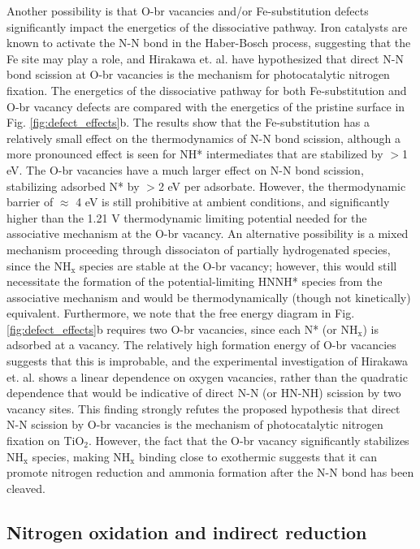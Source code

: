 \documentclass[journal=ascecg,manuscript=article,articletitle=true]{achemso}
\begin{document}
Another possibility is that O-br vacancies and/or Fe-substitution defects significantly impact the energetics of the dissociative pathway. Iron catalysts are known to activate the N-N bond in the Haber-Bosch process\cite{Emmett_1933, Honkala_2005}, suggesting that the Fe site may play a role, and Hirakawa et. al. \cite{Hirakawa_2017} have hypothesized that direct N-N bond scission at O-br vacancies is the mechanism for photocatalytic nitrogen fixation. The energetics of the dissociative pathway for both Fe-substitution and O-br vacancy defects are compared with the energetics of the pristine surface in Fig. \ref{fig:defect_effects}b. The results show that the Fe-substitution has a relatively small effect on the thermodynamics of N-N bond scission, although a more pronounced effect is seen for NH* intermediates that are stabilized by $>$1 eV. The O-br vacancies have a much larger effect on N-N bond scission, stabilizing adsorbed N* by $>$2 eV per adsorbate. However, the thermodynamic barrier of $\approx$ 4 eV is still prohibitive at ambient conditions, and significantly higher than the 1.21 V thermodynamic limiting potential needed for the associative mechanism at the O-br vacancy. An alternative possibility is a mixed mechanism proceeding through dissociaton of partially hydrogenated species, since the NH$_{\mathrm{x}}$ species are stable at the O-br vacancy; however, this would still necessitate the formation of the potential-limiting HNNH* species from the associative mechanism and would be thermodynamically (though not kinetically) equivalent. Furthermore, we note that the free energy diagram in Fig. \ref{fig:defect_effects}b requires two O-br vacancies, since each N* (or NH$_{\mathrm{x}}$) is adsorbed at a vacancy. The relatively high formation energy of O-br vacancies suggests that this is improbable, and the experimental investigation of Hirakawa et. al. \cite{Hirakawa_2017} shows a linear dependence on oxygen vacancies, rather than the quadratic dependence that would be indicative of direct N-N (or HN-NH) scission by two vacancy sites. This finding strongly refutes the proposed hypothesis that direct N-N scission by O-br vacancies is the mechanism of photocatalytic nitrogen fixation on TiO$_2$. However, the fact that the O-br vacancy significantly stabilizes NH$_{\mathrm{x}}$ species, making NH$_{\mathrm{x}}$ binding close to exothermic suggests that it can promote nitrogen reduction and ammonia formation after the N-N bond has been cleaved.

\subsection{Nitrogen oxidation and indirect reduction}
\end{document}
